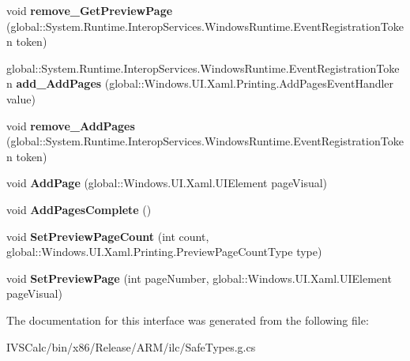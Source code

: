 \begin{DoxyCompactItemize}
\item 
\mbox{\label{interface_windows_1_1_u_i_1_1_xaml_1_1_printing_1_1_i_print_document_aa975f5387eb09201d39628055f1bfb7d}} 
void {\bfseries remove\+\_\+\+Get\+Preview\+Page} (global\+::\+System.\+Runtime.\+Interop\+Services.\+Windows\+Runtime.\+Event\+Registration\+Token token)
\item 
\mbox{\label{interface_windows_1_1_u_i_1_1_xaml_1_1_printing_1_1_i_print_document_a6a0ff286beb8ddcdbe12d51a49010b97}} 
global\+::\+System.\+Runtime.\+Interop\+Services.\+Windows\+Runtime.\+Event\+Registration\+Token {\bfseries add\+\_\+\+Add\+Pages} (global\+::\+Windows.\+U\+I.\+Xaml.\+Printing.\+Add\+Pages\+Event\+Handler value)
\item 
\mbox{\label{interface_windows_1_1_u_i_1_1_xaml_1_1_printing_1_1_i_print_document_a78e46b68309d6b34dfdab7f6631761a6}} 
void {\bfseries remove\+\_\+\+Add\+Pages} (global\+::\+System.\+Runtime.\+Interop\+Services.\+Windows\+Runtime.\+Event\+Registration\+Token token)
\item 
\mbox{\label{interface_windows_1_1_u_i_1_1_xaml_1_1_printing_1_1_i_print_document_ade20244bcf646d2b02009597f231a389}} 
void {\bfseries Add\+Page} (global\+::\+Windows.\+U\+I.\+Xaml.\+U\+I\+Element page\+Visual)
\item 
\mbox{\label{interface_windows_1_1_u_i_1_1_xaml_1_1_printing_1_1_i_print_document_afd3c80952164c742e794be2817c23c65}} 
void {\bfseries Add\+Pages\+Complete} ()
\item 
\mbox{\label{interface_windows_1_1_u_i_1_1_xaml_1_1_printing_1_1_i_print_document_a3fad032cb5b86f827a5b5428c9ba1d34}} 
void {\bfseries Set\+Preview\+Page\+Count} (int count, global\+::\+Windows.\+U\+I.\+Xaml.\+Printing.\+Preview\+Page\+Count\+Type type)
\item 
\mbox{\label{interface_windows_1_1_u_i_1_1_xaml_1_1_printing_1_1_i_print_document_a2fb474592368092099efc8562a7c1bb6}} 
void {\bfseries Set\+Preview\+Page} (int page\+Number, global\+::\+Windows.\+U\+I.\+Xaml.\+U\+I\+Element page\+Visual)
\end{DoxyCompactItemize}


The documentation for this interface was generated from the following file\+:\begin{DoxyCompactItemize}
\item 
I\+V\+S\+Calc/bin/x86/\+Release/\+A\+R\+M/ilc/Safe\+Types.\+g.\+cs\end{DoxyCompactItemize}
